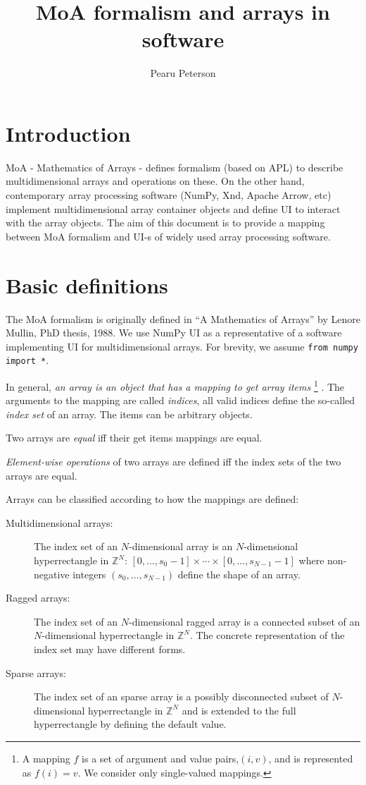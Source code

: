 \documentclass[a4paper,12pt]{article}
\title{MoA formalism and arrays in software}
\author{Pearu Peterson}
\newcommand{\Z}{{\mathbb{Z}}}
\begin{document}
\maketitle
\section{Introduction}

MoA - Mathematics of Arrays - defines formalism (based on APL) to
describe multidimensional arrays and operations on these. On the other
hand, contemporary array processing software (NumPy, Xnd, Apache
Arrow, etc) implement multidimensional array container objects and
define UI to interact with the array objects. The aim of this document
is to provide a mapping between MoA formalism and UI-s of widely used
array processing software.



\section{Basic definitions}

The MoA formalism is originally defined in ``A Mathematics of Arrays''
by Lenore Mullin, PhD thesis, 1988.  We use NumPy UI as a
representative of a software implementing UI for multidimensional
arrays. For brevity, we assume \verb+from numpy import *+.

In general, \emph{an array is an object that has a mapping to get
  array items} \footnote{A mapping $f$ is a set of argument and value
  pairs,$(i,v)$, and is represented as $f(i)=v$. We consider only
  single-valued mappings.} . The arguments to the mapping are called
\emph{indices}, all valid indices define the so-called \emph{index
  set} of an array. The items can be arbitrary objects.

Two arrays are \emph{equal} iff their get items mappings are equal.

\emph{Element-wise operations} of two arrays are defined iff the index
sets of the two arrays are equal.

Arrays can be classified according to how the mappings are defined:
\begin{description}
\item[Multidimensional arrays:] The index set of
  an $N$-dimensional array is an $N$-dimensional hyperrectangle in
  $\Z^N$: $[0,\ldots,s_0-1]\times\cdots\times[0,\ldots,s_{N-1}-1]$
  where non-negative integers $(s_0,\ldots,s_{N-1})$ define the shape
  of an array.
\item[Ragged arrays:] The index set of an
  $N$-dimensional ragged array is a connected subset of an
  $N$-dimensional hyperrectangle in $\Z^N$. The concrete
  representation of the index set may have different forms.
\item[Sparse arrays:] The index set of an sparse array is a possibly
  disconnected subset of $N$-dimensional hyperrectangle in $\Z^N$ and
  is extended to the full hyperrectangle by defining the default
  value.
\end{description}
\end{document}
